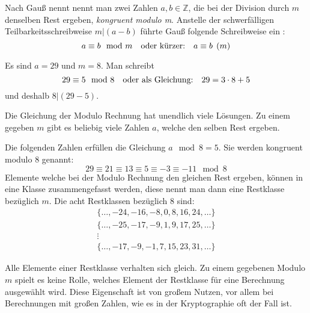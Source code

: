 \newpage
\noindent
Nach Gauß nennt nennt man zwei Zahlen $a, b \in \mathbb{Z}$, die bei der Division durch $m$
denselben Rest ergeben, \textit{kongruent modulo m}. Anstelle der schwerfälligen
Teilbarkeitsschreibweise $m|(a - b)$
führte Gauß folgende Schreibweise ein \parencite[180]{BOOK:numberTheory}:
\begin{equation}
  \label{eq:kongruenz}
  a \equiv b \mod{m} \text{\quad oder kürzer:\quad} a \equiv b \pod{m}
\end{equation}

\begin{example}
  Es sind $a = 29$ und $m = 8$. Man schreibt
  \begin{equation*}
    29 \equiv 5 \mod{8} \text{\quad oder als Gleichung:\quad} 29 = 3 \cdot 8 + 5
  \end{equation*}
  und deshalb $8|(29 - 5)$.
\end{example}

\noindent
Die Gleichung der Modulo Rechnung hat unendlich viele Lösungen. Zu einem gegeben $m$ gibt es
beliebig viele Zahlen $a$, welche den selben Rest ergeben.
\begin{example}
  Die folgenden Zahlen erfüllen die Gleichung $a \mod{8} = 5$.
  Sie werden kongruent modulo 8 genannt:
  \begin{equation*}
    29 \equiv 21 \equiv 13 \equiv 5 \equiv -3 \equiv -11 \mod{8}
  \end{equation*}
  Elemente welche bei der Modulo Rechnung den gleichen Rest ergeben,
  können in eine Klasse zusammengefasst werden, diese nennt man dann eine Restklasse bezüglich $m$.
  Die acht Restklassen bezüglich 8 sind:
  \begin{gather*}
    \{\dots,-24,-16,-8,0,8,16,24,\dots\} \\
    \{\dots,-25,-17,-9,1,9,17,25,\dots\} \\
    \vdots                               \\
    \{\dots,-17,-9,-1,7,15,23,31,\dots\}
  \end{gather*}
\end{example}

\noindent
Alle Elemente einer Restklasse verhalten sich gleich. Zu einem gegebenen Modulo $m$ spielt es
keine Rolle, welches Element der Restklasse für eine Berechnung ausgewählt wird.
Diese Eigenschaft ist von großem Nutzen, vor allem bei Berechnungen mit großen Zahlen,
wie es in der Kryptographie oft der Fall ist.

